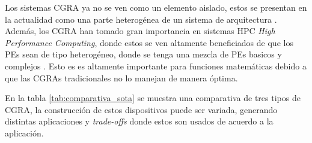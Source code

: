 \documentclass[conference]{IEEEtran}
\begin{document}
Los sistemas CGRA ya no se ven como un elemento aislado, estos se presentan en la actualidad como una parte heterogénea de un sistema de arquitectura \cite{dvhetero}.
Además, los CGRA han tomado gran importancia en sistemas HPC \textit{High Performance Computing}, donde estos se ven altamente beneficiados de que los PEs sean de tipo heterogéneo, donde se tenga una mezcla de PEs basicos y complejos \cite{exploration_tradeoffs}. Esto es es altamente importante para funciones matemáticas debido a que las CGRAs tradicionales no lo manejan de manera óptima.



En la tabla \ref{tab:comparativa_sota} se muestra una comparativa de tres tipos de CGRA, la construcción de estos dispositivos puede ser variada, 
generando distintas aplicaciones y \textit{trade-offs} donde estos son usados de acuerdo a la aplicación. 
\end{document}
